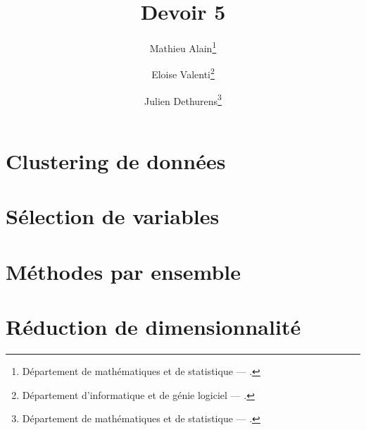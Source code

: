 \documentclass[french, twoside=semi, headings=normal]{scrartcl}
\title{Devoir 5}
\author{Mathieu Alain\thanks{Département de mathématiques et de statistique --- \mailmathieu.} \and Eloise Valenti\thanks{Département d'informatique et de génie logiciel --- \mailelo.} \and Julien Dethurens\thanks{Département de mathématiques et de statistique --- \mailjulien.}}
\begin{document}
\maketitle

\section{Clustering de données}

\section{Sélection de variables}

\section{Méthodes par ensemble}

\section{Réduction de dimensionnalité}
\end{document}
